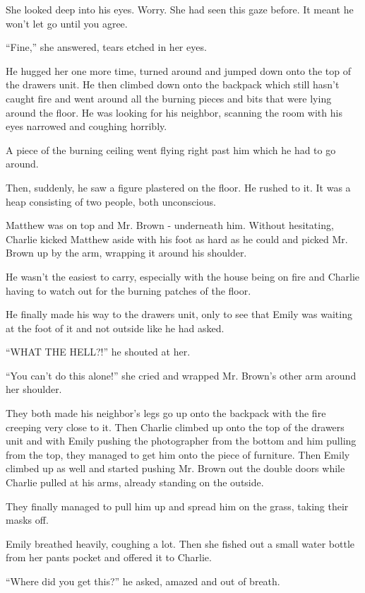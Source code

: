 She looked deep into his eyes. Worry. She had seen this gaze before. It meant he won't let go until you agree.

“Fine,” she answered, tears etched in her eyes.

He hugged her one more time, turned around and jumped down onto the top of the drawers unit. He then climbed down onto the backpack which still hasn't caught fire and went around all the burning pieces and bits that were lying around the floor. He was looking for his neighbor, scanning the room with his eyes narrowed and coughing horribly.

A piece of the burning ceiling went flying right past him which he had to go around.

Then, suddenly, he saw a figure plastered on the floor. He rushed to it. It was a heap consisting of two people, both unconscious.

Matthew was on top and Mr. Brown - underneath him. Without hesitating, Charlie kicked Matthew aside with his foot as hard as he could and picked Mr. Brown up by the arm, wrapping it around his shoulder.

He wasn't the easiest to carry, especially with the house being on fire and Charlie having to watch out for the burning patches of the floor.

He finally made his way to the drawers unit, only to see that Emily was waiting at the foot of it and not outside like he had asked.

“WHAT THE HELL?!” he shouted at her.

“You can't do this alone!” she cried and wrapped Mr. Brown's other arm around her shoulder.

They both made his neighbor's legs go up onto the backpack with the fire creeping very close to it. Then Charlie climbed up onto the top of the drawers unit and with Emily pushing the photographer from the bottom and him pulling from the top, they managed to get him onto the piece of furniture. Then Emily climbed up as well and started pushing Mr. Brown out the double doors while Charlie pulled at his arms, already standing on the outside.

They finally managed to pull him up and spread him on the grass, taking their masks off.

Emily breathed heavily, coughing a lot. Then she fished out a small water bottle from her pants pocket and offered it to Charlie.

“Where did you get this?” he asked, amazed and out of breath.

